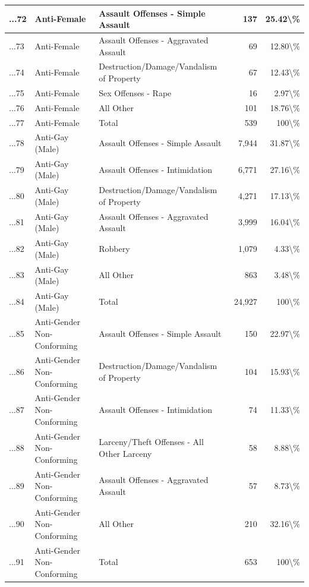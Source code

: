 \documentclass[
]{krantz}
\begin{document}
\begin{longtable}[t]{l|l|l|r|r}
\hline
...72 & Anti-Female & Assault Offenses - Simple Assault & 137 & 25.42\textbackslash{}\%\\
\hline
...73 & Anti-Female & Assault Offenses - Aggravated Assault & 69 & 12.80\textbackslash{}\%\\
\hline
...74 & Anti-Female & Destruction/Damage/Vandalism of Property & 67 & 12.43\textbackslash{}\%\\
\hline
...75 & Anti-Female & Sex Offenses - Rape & 16 & 2.97\textbackslash{}\%\\
\hline
...76 & Anti-Female & All Other & 101 & 18.76\textbackslash{}\%\\
\hline
...77 & Anti-Female & Total & 539 & 100\textbackslash{}\%\\
\hline
...78 & Anti-Gay (Male) & Assault Offenses - Simple Assault & 7,944 & 31.87\textbackslash{}\%\\
\hline
...79 & Anti-Gay (Male) & Assault Offenses - Intimidation & 6,771 & 27.16\textbackslash{}\%\\
\hline
...80 & Anti-Gay (Male) & Destruction/Damage/Vandalism of Property & 4,271 & 17.13\textbackslash{}\%\\
\hline
...81 & Anti-Gay (Male) & Assault Offenses - Aggravated Assault & 3,999 & 16.04\textbackslash{}\%\\
\hline
...82 & Anti-Gay (Male) & Robbery & 1,079 & 4.33\textbackslash{}\%\\
\hline
...83 & Anti-Gay (Male) & All Other & 863 & 3.48\textbackslash{}\%\\
\hline
...84 & Anti-Gay (Male) & Total & 24,927 & 100\textbackslash{}\%\\
\hline
...85 & Anti-Gender Non-Conforming & Assault Offenses - Simple Assault & 150 & 22.97\textbackslash{}\%\\
\hline
...86 & Anti-Gender Non-Conforming & Destruction/Damage/Vandalism of Property & 104 & 15.93\textbackslash{}\%\\
\hline
...87 & Anti-Gender Non-Conforming & Assault Offenses - Intimidation & 74 & 11.33\textbackslash{}\%\\
\hline
...88 & Anti-Gender Non-Conforming & Larceny/Theft Offenses - All Other Larceny & 58 & 8.88\textbackslash{}\%\\
\hline
...89 & Anti-Gender Non-Conforming & Assault Offenses - Aggravated Assault & 57 & 8.73\textbackslash{}\%\\
\hline
...90 & Anti-Gender Non-Conforming & All Other & 210 & 32.16\textbackslash{}\%\\
\hline
...91 & Anti-Gender Non-Conforming & Total & 653 & 100\textbackslash{}\%\\

\end{longtable}
\end{document}
